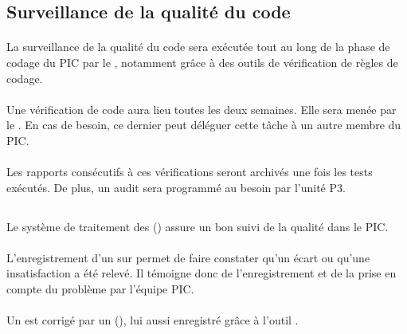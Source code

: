 \subsection{Surveillance de la qualité du code}
\paragraph*{} La surveillance de la qualité du code sera exécutée tout au long de la phase de codage du
PIC par le \RD , notamment grâce à des outils de vérification de règles de codage.

\paragraph*{} Une vérification de code aura lieu toutes les deux semaines. Elle sera menée par le \RD . En cas de besoin, ce dernier peut déléguer cette tâche à un autre membre
du PIC.

\paragraph*{} Les rapports consécutifs à ces vérifications seront archivés une fois les tests exécutés. De plus, un audit sera programmé au besoin par l'unité P3.

\subsection{\FT}
\paragraph*{} Le système de traitement des \FT (\FTCourt) assure un bon suivi de la qualité dans
le PIC.

\paragraph*{} L'enregistrement d'un \FT sur \lintranet permet de faire constater qu'un écart ou
qu'une insatisfaction a été relevé. Il témoigne donc de l'enregistrement et de la prise en compte
du problème par l'équipe PIC.

\paragraph*{} Un \FTCourt est corrigé par un \OC (\OCCourt), lui aussi enregistré grâce à l'outil
\lintranet .

\subsubsection*{\FT}
